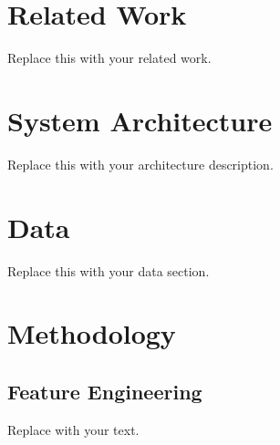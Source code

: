 \documentclass[conference]{IEEEtran}
\begin{document}
\section{Related Work}
\label{sec:related}
Replace this with your related work.

\section{System Architecture}
\label{sec:architecture}
Replace this with your architecture description.

\section{Data}
\label{sec:data}
Replace this with your data section.

\section{Methodology}
\label{sec:methodology}
\subsection{Feature Engineering}
Replace with your text.
\end{document}
